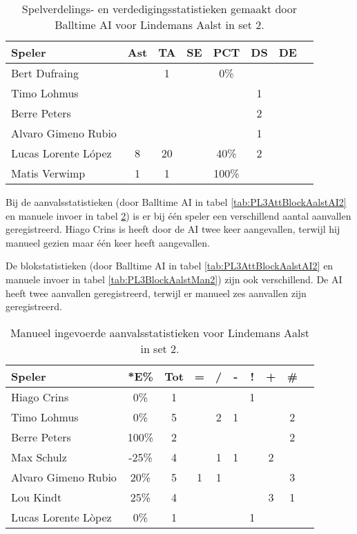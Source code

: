 \begin{table}[ht!]
  \centering
  \scriptsize
  \begin{tabular}{|l|c|c|c|c|c|c|c|} \hline
    \textbf{Speler} & Ast & TA & SE & PCT & DS & DE \\ \hline
    Bert Dufraing &  & 1 &  & 0\% &  &  \\
    Timo Lohmus &   &   &   &   & 1  &   \\
    Berre Peters &   &   &   &   &  2 &   \\
    Alvaro Gimeno Rubio &  &  &  &  & 1 &   \\
    Lucas Lorente López & 8 & 20 &  & 40\% & 2 &  \\
    Matis Verwimp & 1 & 1 &  & 100\% &   &   \\ \hline
  \end{tabular}
  \caption[Spelverdelings- en verdedigingsstatistieken gemaakt door Balltime AI voor Lindemans Aalst in set 2]{\label{tab:PL3SetDigAalstAI2}Spelverdelings- en verdedigingsstatistieken gemaakt door Balltime AI voor Lindemans Aalst in set 2.}
\end{table}

Bij de aanvalsstatistieken (door Balltime AI in tabel \ref{tab:PL3AttBlockAalstAI2} en manuele invoer in tabel \ref{tab:PL3AttAalstMan2}) is er bij één speler een verschillend aantal aanvallen geregistreerd. Hiago Crins is heeft door de AI twee keer aangevallen, terwijl hij manueel gezien maar één keer heeft aangevallen.

De blokstatistieken (door Balltime AI in tabel \ref{tab:PL3AttBlockAalstAI2} en manuele invoer in tabel \ref{tab:PL3BlockAalstMan2}) zijn ook verschillend. De AI heeft twee aanvallen geregistreerd, terwijl er manueel zes aanvallen zijn geregistreerd. 

\begin{table}[ht!]
    \centering
    \scriptsize
    \begin{tabular}{|l|c|c|c|c|c|c|c|c|c|}
        \hline
        \textbf{Speler} & *E\% & Tot & = & / & - & ! & + & \# \\ \hline
        Hiago Crins & 0\% & 1 &  &  &  & 1 &  & \\ 
        Timo Lohmus & 0\% & 5 &  & 2 & 1 &  & & 2 \\ 
        Berre Peters & 100\% & 2 &  &  & & & & 2 \\ 
        Max Schulz & -25\% & 4 &  & 1 & 1 &  & 2 & \\ 
        Alvaro Gimeno Rubio & 20\% & 5 & 1 & 1 &  &  &  & 3 \\ 
        Lou Kindt & 25\% & 4 &  &  &  &  & 3 & 1 \\
        Lucas Lorente Lòpez & 0\% & 1 &  &  &  & 1 &  & \\ \hline
    \end{tabular}
    \caption[Manueel ingevoerde aanvalsstatistieken voor Lindemans Aalst in set 2]{\label{tab:PL3AttAalstMan2}Manueel ingevoerde aanvalsstatistieken voor Lindemans Aalst in set 2.}
\end{table}

